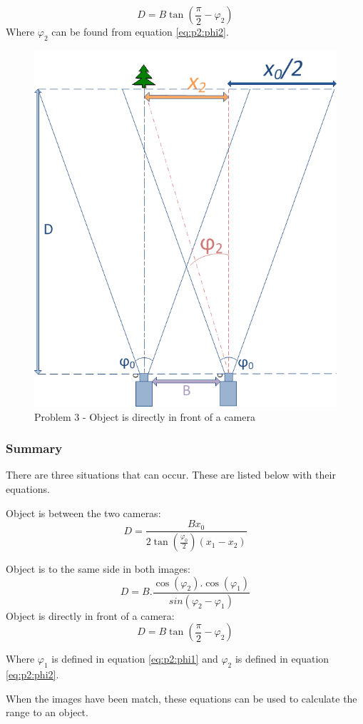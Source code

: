 \begin{equation} \label{eq:p3:D}
D = B \tan(\frac{\pi}{2} - \varphi_{2})
\end{equation}
Where $\varphi_2$ can be found from equation \ref{eq:p2:phi2}. 
\begin{figure}
\includegraphics[width=\textwidth,height=\textheight,keepaspectratio]{Figures/problem3.png}
\caption{Problem 3 - Object is directly in front of a camera}
\label{fig:problem_infront}
\end{figure}

\subsubsection{Summary}
There are three situations that can occur. These are listed below with their equations.

Object is between the two cameras:
\begin{equation} \label{eq:summary:1}
D = \frac{Bx_0}{2\tan(\frac{\varphi_0}{2})(x_1 - x_2)}
\end{equation}

Object is to the same side in both images:
\begin{equation} \label{eq:summary:2}
D = B.\frac{\cos(\varphi_2).\cos(\varphi_1)}{sin(\varphi_2 - \varphi_1)}
\end{equation}
Object is directly in front of a camera:
\begin{equation} \label{eq:summary:3}
D = B \tan(\frac{\pi}{2} - \varphi_{2})
\end{equation}

Where $\varphi_1$ is defined in equation \eqref{eq:p2:phi1} and $\varphi_2$ is defined in equation \eqref{eq:p2:phi2}.

When the images have been match, these equations can be used to calculate the range to an object.